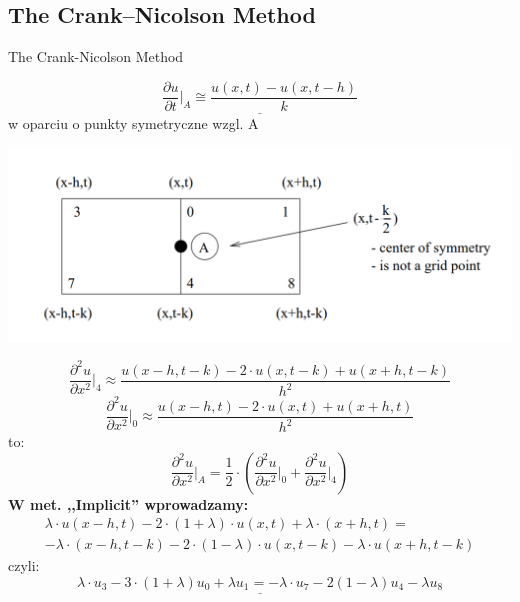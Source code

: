 
\subsection{The Crank--Nicolson Method}
\begin{frame}{The Crank-Nicolson Method}

\begin{block}{}
 \end{block}
 
\begin{equation}\underline{\frac{\partial u}{\partial t} \Big \vert _{A}\cong \frac{u(x,t) - u(x,t - h)}{k}}\end{equation} w oparciu o punkty symetryczne wzgl. A
 
 \centerline{\includegraphics[width = 1 \linewidth]{img/23/crank}}
\end{frame}

\begin{frame}
\begin{equation} \frac{\partial ^2 u}{\partial x^2} \Big \vert _{4}\approx \frac{u(x - h,t - k) - 2 \cdot u(x,t - k) + u(x + h, t - k)}{h^2}\end{equation}
\begin{equation} \frac{\partial ^2 u}{\partial x^2} \Big \vert _{0}\approx \frac{u(x - h,t) - 2 \cdot u(x,t) + u(x + h, t)}{h^2} \end{equation}
to:
\begin{equation} \frac{\partial ^2 u}{\partial x^2} \big \vert _{A} = \frac{1}{2} \cdot \left ( \frac{\partial ^2 u}{\partial x^2} \Big \vert _{0} + \frac{\partial ^2 u}{\partial x^2} \Big \vert _{4} \right )\end{equation}
\textbf{W met. ,,Implicit'' wprowadzamy:}
\begin{multline} \lambda \cdot u(x-h,t) - 2 \cdot (1+\lambda)\cdot u(x,t) + \lambda \cdot (x+h,t) = \\
 -\lambda \cdot (x-h,t-k) - 2 \cdot (1-\lambda) \cdot u(x,t-k) - \lambda \cdot u(x+h,t-k)\end{multline}
czyli:
$$ \underline{\lambda \cdot u_3 - 3\cdot (1+\lambda)u_0 + \lambda u_1 = -\lambda \cdot u_7 - 2(1-\lambda)u_4 - \lambda u_8}$$
\end{frame}